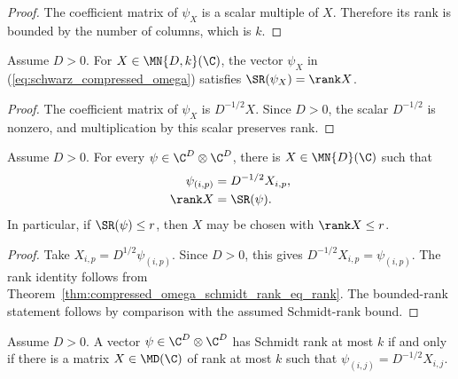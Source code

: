 \begin{proof}
    \leanok
    The coefficient matrix of $\psi_X$ is a scalar multiple of $X$. Therefore
    its rank is bounded by the number of columns, which is $k$.
\end{proof}

\begin{theorem}
    \label{thm:compressed_omega_schmidt_rank_eq_rank}
    \leanok
    Assume $D>0$. For $X\in\MN{D,k}(\C)$, the vector $\psi_X$ in
    (\ref{eq:schwarz_compressed_omega}) satisfies
    $\SR(\psi_X)=\rank X$.
\end{theorem}

\begin{proof}
    \leanok
    The coefficient matrix of $\psi_X$ is $D^{-1/2}X$. Since $D>0$, the
    scalar $D^{-1/2}$ is nonzero, and multiplication by this scalar preserves
    rank.
\end{proof}

\begin{theorem}
    \label{thm:square_schmidt_rank_exact_parametrization}
    \leanok
    Assume $D>0$. For every $\psi\in\C^D\otimes\C^D$, there is
    $X\in\MN{D}(\C)$ such that
    \begin{align}
        \psi_{(i,p)}
         & =D^{-1/2}X_{i,p}, \notag \\
        \rank X
         & =\SR(\psi).
        \label{eq:schwarz_square_schmidt_representative}
    \end{align}
    In particular, if $\SR(\psi)\le r$, then $X$ may be chosen with
    $\rank X\le r$.
\end{theorem}

\begin{proof}
    \leanok
    Take $X_{i,p}=D^{1/2}\psi_{(i,p)}$. Since $D>0$, this gives
    $D^{-1/2}X_{i,p}=\psi_{(i,p)}$. The rank identity follows from
    Theorem~\ref{thm:compressed_omega_schmidt_rank_eq_rank}. The bounded-rank
    statement follows by comparison with the assumed Schmidt-rank bound.
\end{proof}

\begin{lemma}
    \label{lem:schmidt_rank_square_compressed_omega}
    \leanok
    Assume $D>0$. A vector $\psi\in\C^D\otimes\C^D$ has Schmidt rank at most
    $k$ if and only if there is a matrix $X\in\MD(\C)$ of rank at most $k$
    such that $\psi_{(i,j)}=D^{-1/2}X_{i,j}$.
\end{lemma}

